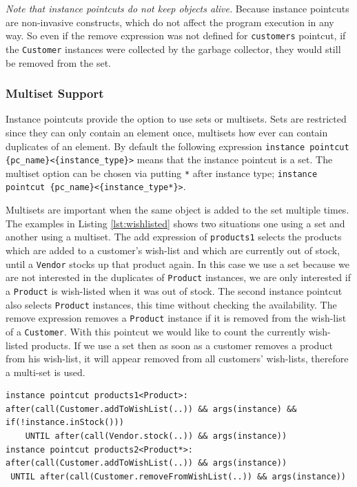 \documentclass{llncs}
\begin{document}
\emph{Note that instance pointcuts do not keep objects alive.} Because instance pointcuts are non-invasive constructs, which do not affect the program execution in any way. So even if the remove expression was not defined for \texttt{customers} pointcut, if the \texttt{Customer} instances were collected by the garbage collector, they would still be removed from the set. 


\subsubsection{Multiset Support}
Instance pointcuts provide the option to use sets or multisets. Sets are restricted since they can only contain an element once, multisets how ever can contain duplicates of an element. By default the following expression \lstinline!instance pointcut {pc_name}<{instance_type}>! means that the instance pointcut is a set. The multiset option can be chosen via putting \texttt{*} after instance type; \lstinline!instance pointcut {pc_name}<{instance_type*}>!.

Multisets are important when the same object is added to the set multiple times. The examples in Listing \ref{lst:wishlisted} shows two situations one using a set and another using a multiset. The add expression of \texttt{products1} selects the products which are added to a customer's wish-list and which are currently out of stock, until a \texttt{Vendor} stocks up that product again. In this case we use a set because we are not interested in the duplicates of \texttt{Product} instances, we are only interested if a \texttt{Product} is wish-listed when it was out of stock. The second instance pointcut also selects \texttt{Product} instances, this time without checking the availability. The remove expression removes a \texttt{Product} instance if it is removed from the wish-list of a \texttt{Customer}. With this pointcut we would like to count the currently wish-listed products. If we use a set then as soon as a customer removes a product from his wish-list, it will appear removed from all customers' wish-lists, therefore a multi-set is used. 

\begin{lstlisting}[float=h!, caption={Two instance pointcuts, each maintains a set of wish-listed products}, label={lst:wishlisted}]
instance pointcut products1<Product>: 
after(call(Customer.addToWishList(..)) && args(instance) && if(!instance.inStock())) 
	UNTIL after(call(Vendor.stock(..)) && args(instance))
instance pointcut products2<Product*>: 
after(call(Customer.addToWishList(..)) && args(instance))
 UNTIL after(call(Customer.removeFromWishList(..)) && args(instance))
\end{lstlisting}
\end{document}

